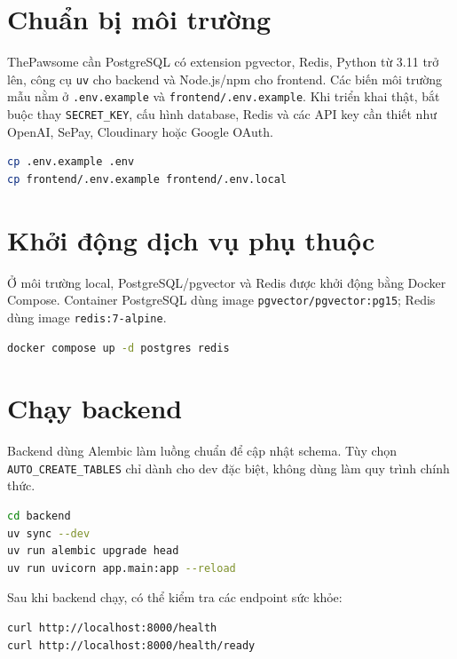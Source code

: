 \documentclass[../DoAn.tex]{subfiles}
\begin{document}
\section{Chuẩn bị môi trường}
\label{appendix:A.1}

ThePawsome cần PostgreSQL có extension pgvector, Redis, Python từ 3.11 trở lên, công cụ \texttt{uv} cho backend và Node.js/npm cho frontend. Các biến môi trường mẫu nằm ở \texttt{.env.example} và \texttt{frontend/.env.example}. Khi triển khai thật, bắt buộc thay \texttt{SECRET\_KEY}, cấu hình database, Redis và các API key cần thiết như OpenAI, SePay, Cloudinary hoặc Google OAuth.

\begin{lstlisting}[language=bash,caption={Chuẩn bị file môi trường local}]
cp .env.example .env
cp frontend/.env.example frontend/.env.local
\end{lstlisting}

\section{Khởi động dịch vụ phụ thuộc}
\label{appendix:A.2}

Ở môi trường local, PostgreSQL/pgvector và Redis được khởi động bằng Docker Compose. Container PostgreSQL dùng image \texttt{pgvector/pgvector:pg15}; Redis dùng image \texttt{redis:7-alpine}.

\begin{lstlisting}[language=bash,caption={Khởi động PostgreSQL và Redis}]
docker compose up -d postgres redis
\end{lstlisting}

\section{Chạy backend}
\label{appendix:A.3}

Backend dùng Alembic làm luồng chuẩn để cập nhật schema. Tùy chọn \texttt{AUTO\_CREATE\_TABLES} chỉ dành cho dev đặc biệt, không dùng làm quy trình chính thức.

\begin{lstlisting}[language=bash,caption={Cài đặt và chạy backend}]
cd backend
uv sync --dev
uv run alembic upgrade head
uv run uvicorn app.main:app --reload
\end{lstlisting}

Sau khi backend chạy, có thể kiểm tra các endpoint sức khỏe:

\begin{lstlisting}[language=bash,caption={Kiểm tra backend health check}]
curl http://localhost:8000/health
curl http://localhost:8000/health/ready
\end{lstlisting}
\end{document}
